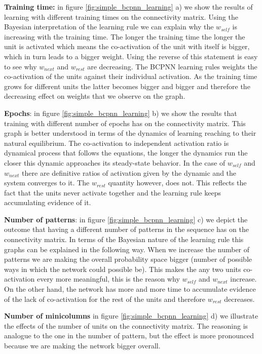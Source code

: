 \documentclass[10pt,a4paper]{article}
\begin{document}
\textbf{Training time:} in figure \ref{fig:simple_bcpnn_learning} a) we show the results of learning with different training times on the connectivity matrix. Using the Bayesian interpretation of the learning rule we can explain why the $w_{self}$ is increasing with the training time. The longer the training time the longer the unit is activated which means the co-activation of the unit with itself is bigger, which in turn leads to a bigger weight. Using the reverse of this statement is easy to see why $w_{next}$ and $w_{rest}$ are decreasing. The BCPNN learning rules weights the co-activation of the units against their individual activation. As the training time grows for different units the latter becomes bigger and bigger and therefore the decreasing effect on weights that we observe on the graph.  

\textbf{Epochs}: in figure \ref{fig:simple_bcpnn_learning} b) we show the results that training with different number of epochs has on the connectivity matrix. This graph is better understood in terms of the dynamics of learning reaching to their natural equilibrium. The co-activation to independent activation ratio is dynamical process that follows the equations, the longer the dynamics run the closer this dynamic approaches its steady-state behavior. In the case of $w_{self}$ and $w_{next}$ there are definitive ratios of activation given by the dynamic and the system converges to it. The $w_{rest}$ quantity however, does not. This reflects the fact that the units never activate together and the learning rule keeps accumulating evidence of it. 

\textbf{Number of patterns}: in figure \ref{fig:simple_bcpnn_learning} c) we depict the outcome that having a different number of patterns in the sequence has on the connectivity matrix. In terms of the Bayesian nature of the learning rule this graphs can be explained in the following way. When we increase the number of patterns we are making the overall probability space bigger (number of possible ways in which the network could possible be). This makes the any two units co-activation every more meaningful, this is the reason why $w_{self}$ and $w_{next}$ increase. On the other hand, the network has more and more time to accumulate evidence of the lack of co-activation for the rest of the units and therefore $w_{rest}$ decreases. 


\textbf{Number of minicolumns} in figure \ref{fig:simple_bcpnn_learning} d) we illustrate the effects of the number of units on the connectivity matrix. The reasoning is analogue to the one in the number of pattern, but the effect is more pronounced because we are making the network bigger overall. 
\end{document}
